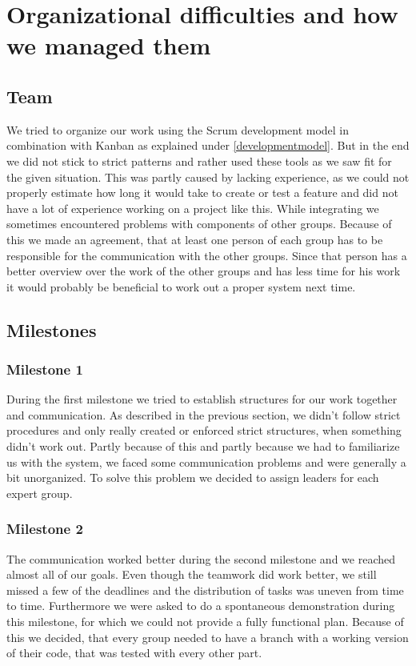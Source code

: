 \documentclass[main.tex]{subfiles}
\begin{document}
	\begingroup

	\renewcommand{\cleardoublepage}{}

	\renewcommand{\clearpage}{}

	\chapter{Organizational difficulties and how we managed them}

		
		\section{Team}
		We tried to organize our work using the Scrum development model in combination with Kanban as explained under \ref{developmentmodel}. But in the end we did not stick to strict patterns and rather used these tools as we saw fit for the given situation. This was partly caused by lacking experience, as we could not properly estimate how long it would take to create or test a feature and did not have a lot of experience working on a project like this.
		While integrating we sometimes encountered problems with components of other groups. Because of this we made an agreement, that at least one person of each group has to be responsible for the communication with the other groups. Since that person has a better overview over the work of the other groups and has less time for his work it would probably be beneficial to work out a proper system next time.
		
		\section{Milestones}
		
		\subsection{Milestone 1}
		During the first milestone we tried to establish structures for our work together and communication. As described in the previous section, we didn't follow strict procedures and only really created or enforced strict structures, when something didn't work out. Partly because of this and partly because we had to familiarize us with the system, we faced some communication problems and were generally a bit unorganized. To solve this problem we decided to assign leaders for each expert group.
		
		\subsection{Milestone 2}
		The communication worked better during the second milestone and we reached almost all of our goals. Even though the teamwork did work better, we still missed a few of the deadlines and the distribution of tasks was uneven from time to time. Furthermore we were asked to do a spontaneous demonstration during this milestone, for which we could not provide a fully functional plan. Because of this we decided, that every group needed to have a branch with a working version of their code, that was tested with every other part.
		
\end{document}
